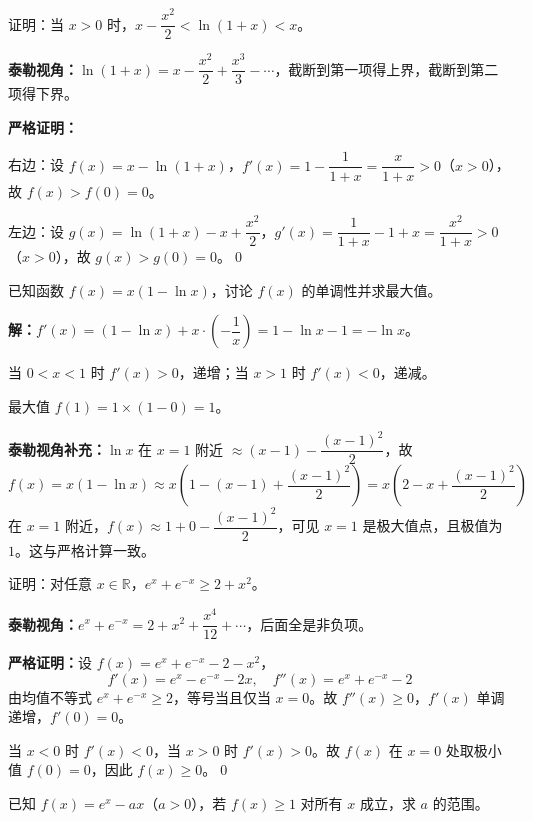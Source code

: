 \documentclass[12pt, a4paper]{ctexart}
\begin{document}
\begin{examplebox}[【例题7】放缩证明综合]
证明：当 $x > 0$ 时，$x - \dfrac{x^2}{2} < \ln(1+x) < x$。
\end{examplebox}

\textbf{泰勒视角：}$\ln(1+x) = x - \dfrac{x^2}{2} + \dfrac{x^3}{3} - \cdots$，截断到第一项得上界，截断到第二项得下界。

\textbf{严格证明：}

右边：设 $f(x) = x - \ln(1+x)$，$f'(x) = 1 - \dfrac{1}{1+x} = \dfrac{x}{1+x} > 0$（$x > 0$），故 $f(x) > f(0) = 0$。

左边：设 $g(x) = \ln(1+x) - x + \dfrac{x^2}{2}$，$g'(x) = \dfrac{1}{1+x} - 1 + x = \dfrac{x^2}{1+x} > 0$（$x > 0$），故 $g(x) > g(0) = 0$。\qed

\begin{examplebox}
已知函数 $f(x) = x(1 - \ln x)$，讨论 $f(x)$ 的单调性并求最大值。
\end{examplebox}

\textbf{解：}$f'(x) = (1 - \ln x) + x \cdot \left(-\dfrac{1}{x}\right) = 1 - \ln x - 1 = -\ln x$。

当 $0 < x < 1$ 时 $f'(x) > 0$，递增；当 $x > 1$ 时 $f'(x) < 0$，递减。

最大值 $f(1) = 1 \times (1 - 0) = 1$。

\textbf{泰勒视角补充：}$\ln x$ 在 $x = 1$ 附近 $\approx (x-1) - \dfrac{(x-1)^2}{2}$，故
\[
f(x) = x(1 - \ln x) \approx x\left(1 - (x-1) + \frac{(x-1)^2}{2}\right) = x\left(2 - x + \frac{(x-1)^2}{2}\right)
\]
在 $x = 1$ 附近，$f(x) \approx 1 + 0 - \dfrac{(x-1)^2}{2}$，可见 $x = 1$ 是极大值点，且极值为 $1$。这与严格计算一致。

\begin{examplebox}[【例题9】泰勒展开与不等式综合]
证明：对任意 $x \in \mathbb{R}$，$e^x + e^{-x} \geq 2 + x^2$。
\end{examplebox}

\textbf{泰勒视角：}$e^x + e^{-x} = 2 + x^2 + \dfrac{x^4}{12} + \cdots$，后面全是非负项。

\textbf{严格证明：}设 $f(x) = e^x + e^{-x} - 2 - x^2$，
\[
f'(x) = e^x - e^{-x} - 2x, \quad f''(x) = e^x + e^{-x} - 2
\]
由均值不等式 $e^x + e^{-x} \geq 2$，等号当且仅当 $x = 0$。故 $f''(x) \geq 0$，$f'(x)$ 单调递增，$f'(0) = 0$。

当 $x < 0$ 时 $f'(x) < 0$，当 $x > 0$ 时 $f'(x) > 0$。故 $f(x)$ 在 $x = 0$ 处取极小值 $f(0) = 0$，因此 $f(x) \geq 0$。\qed

\begin{examplebox}[【例题10】高考压轴题展开视角]
已知 $f(x) = e^x - ax$（$a > 0$），若 $f(x) \geq 1$ 对所有 $x$ 成立，求 $a$ 的范围。
\end{examplebox}
\end{document}
